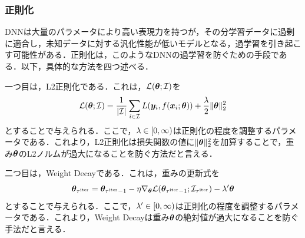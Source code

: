 \documentclass[12pt]{jarticle}
\numberwithin{equation}{section}    %
\numberwithin{figure}{section}      %
\numberwithin{table}{section}      %
\begin{document}
\subsubsection{正則化}
DNNは大量のパラメータにより高い表現力を持つが，その分学習データに過剰に適合し，未知データに対する汎化性能が低いモデルとなる，過学習を引き起こす可能性がある．正則化は，このようなDNNの過学習を防ぐための手段である．以下，具体的な方法を四つ述べる．

一つ目は，L2正則化である．これは，$\mathcal{L}(\bm{\theta}; \mathcal{I})$を
\begin{equation}
    \label{sec3:eq:l2_reg}
    \mathcal{L}(\bm{\theta}; \mathcal{I}) = \frac{1}{|\mathcal{I}|} \sum_{i \in \mathcal{I}} L(\bm{y}_{i}, f(\bm{x}_{i}; \bm{\theta})) + \frac{\lambda}{2} \|\bm{\theta}\|_{2}^{2}
\end{equation}
とすることで与えられる．ここで，$\lambda \in [0, \infty)$は正則化の程度を調整するパラメータである．これより，L2正則化は損失関数の値に$\|\bm{\theta}\|_{2}^{2}$を加算することで，重み$\bm{\theta}$のL2ノルムが過大になることを防ぐ方法だと言える．

二つ目は，Weight Decayである．これは，重みの更新式を
\begin{equation}
    \label{sec3:eq:weight_decay}
    \bm{\theta}_{\tau^{\text{iter}}} = \bm{\theta}_{\tau^{\text{iter}} - 1} - \eta \nabla_{\bm{\theta}} \mathcal{L}(\bm{\theta}_{\tau^{\text{iter}} - 1}; \mathcal{I}_{\tau^{\text{iter}}}) - \lambda' \bm{\theta}
\end{equation}
とすることで与えられる．ここで，$\lambda' \in [0, \infty)$は正則化の程度を調整するパラメータである．これより，Weight Decayは重み$\bm{\theta}$の絶対値が過大になることを防ぐ手法だと言える．
\end{document}

